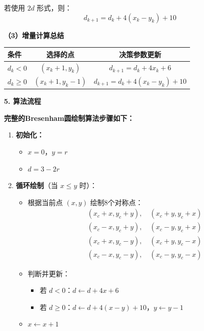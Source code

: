 ﻿\documentclass[12pt,a4paper]{article}
\begin{document}
\begin{tcolorbox}[breakable]
若使用 $2d$ 形式，则：
\begin{equation}
\boxed{d_{k+1} = d_k + 4(x_k - y_k) + 10}
\end{equation}

\textbf{（3）增量计算总结}

\begin{center}
\begin{tabular}{|l|c|c|}
\hline
\textbf{条件} & \textbf{选择的点} & \textbf{决策参数更新} \\
\hline
$d_k < 0$ & $(x_k+1, y_k)$ & $d_{k+1} = d_k + 4x_k + 6$ \\
\hline
$d_k \geq 0$ & $(x_k+1, y_k-1)$ & $d_{k+1} = d_k + 4(x_k-y_k) + 10$ \\
\hline
\end{tabular}
\end{center}

\vspace{3mm}

\textbf{5. 算法流程}

\textbf{完整的Bresenham圆绘制算法步骤如下：}

\begin{enumerate}
\item \textbf{初始化：}
  \begin{itemize}
  \item $x = 0$，$y = r$
  \item $d = 3 - 2r$
  \end{itemize}

\item \textbf{循环绘制}（当 $x \leq y$ 时）：
  \begin{itemize}
  \item 根据当前点 $(x, y)$ 绘制8个对称点：
    \begin{align*}
    &(x_c+x, y_c+y), \quad (x_c+y, y_c+x) \\
    &(x_c-x, y_c+y), \quad (x_c-y, y_c+x) \\
    &(x_c+x, y_c-y), \quad (x_c+y, y_c-x) \\
    &(x_c-x, y_c-y), \quad (x_c-y, y_c-x)
    \end{align*}
  \item 判断并更新：
    \begin{itemize}
    \item 若 $d < 0$：$d \leftarrow d + 4x + 6$
    \item 若 $d \geq 0$：$d \leftarrow d + 4(x-y) + 10$，$y \leftarrow y - 1$
    \end{itemize}
  \item $x \leftarrow x + 1$
  \end{itemize}


\end{enumerate}
\end{tcolorbox}
\end{document}
